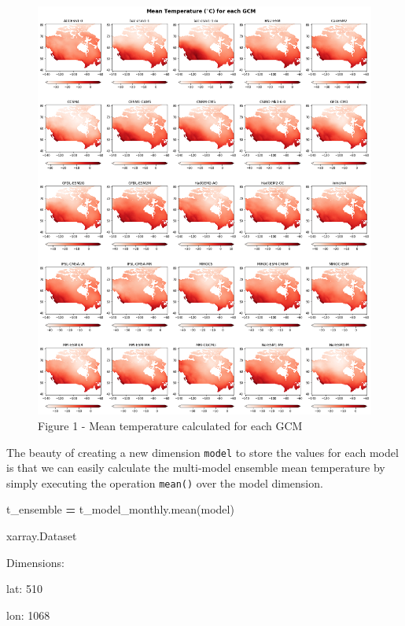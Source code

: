 \documentclass[
]{book}
\newenvironment{Shaded}{\begin{snugshade}}{\end{snugshade}}
\newcommand{\NormalTok}[1]{#1}
\newcommand{\OperatorTok}[1]{\textcolor[rgb]{0.81,0.36,0.00}{\textbf{#1}}}
\newcommand{\StringTok}[1]{\textcolor[rgb]{0.31,0.60,0.02}{#1}}
\begin{document}
\begin{figure}
\centering
\includegraphics{output_15_0.png}
\caption{Figure 1 - Mean temperature calculated for each GCM}
\end{figure}

The beauty of creating a new dimension \texttt{model} to store the values for each model is that we can easily calculate the multi-model ensemble mean temperature by simply executing the operation \texttt{mean()} over the model dimension.

\begin{Shaded}
\begin{Highlighting}[]
\NormalTok{t\_ensemble }\OperatorTok{=}\NormalTok{ t\_model\_monthly.mean(}\StringTok{\textquotesingle{}model\textquotesingle{}}\NormalTok{)}
\end{Highlighting}
\end{Shaded}

xarray.Dataset

Dimensions:

{lat}: 510

{lon}: 1068
\end{document}
